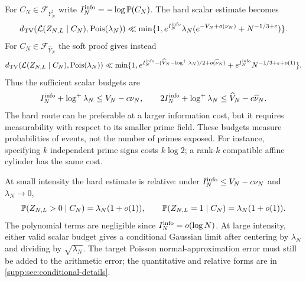 For $C_N\in\mathcal F_{Y_N^\sharp}$ write
$I_N^{\rm info}=-\log\mathbb P(C_N)$. The hard scalar estimate becomes
\begin{equation}\label{eq:hard-conditioned}
 d_{\mathrm{TV}}(\mathcal L(Z_{N,L}\mid C_N),\operatorname{Pois}(\lambda_N))
 \ll \min\{1,e^{I_N^{\rm info}}\lambda_N
           (e^{-V_N+o(\nu_N)}+N^{-1/3+\varepsilon})\}.
\end{equation}
For $C_N\in\mathcal F_{\widehat Y_N}$ the soft proof gives instead
\begin{equation}\label{eq:soft-conditioned}
 d_{\mathrm{TV}}(\mathcal L(Z_{N,L}\mid C_N),\operatorname{Pois}(\lambda_N))
 \ll\min\{1,e^{I_N^{\rm info}-(\widehat V_N-\log^+\lambda_N)/2
                         +o(\widehat\nu_N)}
              +e^{I_N^{\rm info}}N^{-1/3+\varepsilon+o(1)}\}.
\end{equation}
Thus the sufficient scalar budgets are
\[
 I_N^{\rm info}+\log^+\lambda_N\le V_N-c\nu_N,
 \qquad
 2I_N^{\rm info}+\log^+\lambda_N\le\widehat V_N-c\widehat\nu_N.
\]
The hard route can be preferable at a larger information cost, but it
requires measurability with respect to its smaller prime field. These
budgets measure probabilities of events, not the number of primes exposed.
For instance, specifying $k$ independent prime signs costs $k\log2$;
a rank-$k$ compatible affine cylinder has the same cost.

At small intensity the hard estimate is relative: under
$I_N^{\rm info}\le V_N-c\nu_N$ and $\lambda_N\to0$,
\begin{equation}\label{eq:conditional-one-hit}
 \mathbb P(Z_{N,L}>0\mid C_N)=\lambda_N(1+o(1)),\qquad
 \mathbb P(Z_{N,L}=1\mid C_N)=\lambda_N(1+o(1)).
\end{equation}
The polynomial terms are negligible since $I_N^{\rm info}=o(\log N)$.
At large intensity, either valid scalar budget gives a conditional Gaussian
limit after centering by $\lambda_N$ and dividing by $\sqrt{\lambda_N}$.
The target Poisson normal-approximation error must still be added to the
arithmetic error; the quantitative and relative forms are in
\cref{supp:sec:conditional-details}.


